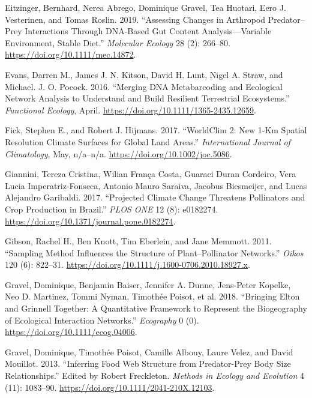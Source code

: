 \documentclass[11pt]{article}
\begin{document}
\leavevmode\hypertarget{ref-EitzAbre19}{}%
Eitzinger, Bernhard, Nerea Abrego, Dominique Gravel, Tea Huotari, Eero
J. Vesterinen, and Tomas Roslin. 2019. ``Assessing Changes in Arthropod
Predator--Prey Interactions Through DNA-Based Gut Content
Analysis---Variable Environment, Stable Diet.'' \emph{Molecular Ecology}
28 (2): 266--80. \url{https://doi.org/10.1111/mec.14872}.

\leavevmode\hypertarget{ref-EvanKits16}{}%
Evans, Darren M., James J. N. Kitson, David H. Lunt, Nigel A. Straw, and
Michael. J. O. Pocock. 2016. ``Merging DNA Metabarcoding and Ecological
Network Analysis to Understand and Build Resilient Terrestrial
Ecosystems.'' \emph{Functional Ecology}, April.
\url{https://doi.org/10.1111/1365-2435.12659}.

\leavevmode\hypertarget{ref-FickHijm17}{}%
Fick, Stephen E., and Robert J. Hijmans. 2017. ``WorldClim 2: New 1-Km
Spatial Resolution Climate Surfaces for Global Land Areas.''
\emph{International Journal of Climatology}, May, n/a--n/a.
\url{https://doi.org/10.1002/joc.5086}.

\leavevmode\hypertarget{ref-GianCost17}{}%
Giannini, Tereza Cristina, Wilian França Costa, Guaraci Duran Cordeiro,
Vera Lucia Imperatriz-Fonseca, Antonio Mauro Saraiva, Jacobus
Biesmeijer, and Lucas Alejandro Garibaldi. 2017. ``Projected Climate
Change Threatens Pollinators and Crop Production in Brazil.'' \emph{PLOS
ONE} 12 (8): e0182274.
\url{https://doi.org/10.1371/journal.pone.0182274}.

\leavevmode\hypertarget{ref-GibsKnot11}{}%
Gibson, Rachel H., Ben Knott, Tim Eberlein, and Jane Memmott. 2011.
``Sampling Method Influences the Structure of Plant--Pollinator
Networks.'' \emph{Oikos} 120 (6): 822--31.
\url{https://doi.org/10.1111/j.1600-0706.2010.18927.x}.

\leavevmode\hypertarget{ref-GravBais18}{}%
Gravel, Dominique, Benjamin Baiser, Jennifer A. Dunne, Jens-Peter
Kopelke, Neo D. Martinez, Tommi Nyman, Timothée Poisot, et al. 2018.
``Bringing Elton and Grinnell Together: A Quantitative Framework to
Represent the Biogeography of Ecological Interaction Networks.''
\emph{Ecography} 0 (0). \url{https://doi.org/10.1111/ecog.04006}.

\leavevmode\hypertarget{ref-GravPois13}{}%
Gravel, Dominique, Timothée Poisot, Camille Albouy, Laure Velez, and
David Mouillot. 2013. ``Inferring Food Web Structure from Predator-Prey
Body Size Relationships.'' Edited by Robert Freckleton. \emph{Methods in
Ecology and Evolution} 4 (11): 1083--90.
\url{https://doi.org/10.1111/2041-210X.12103}.
\end{document}
